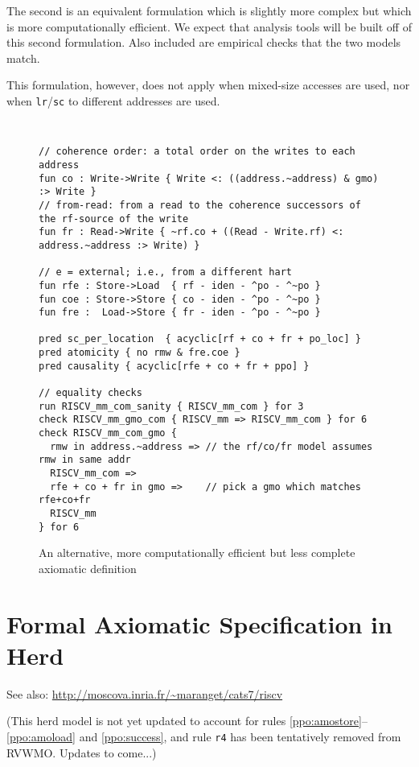 \clearpage
The second is an equivalent formulation which is slightly more complex but which is more computationally efficient.  We expect that analysis tools will be built off of this second formulation.  Also included are empirical checks that the two models match.

This formulation, however, does not apply when mixed-size accesses are used, nor when {\tt lr}/{\tt sc} to different addresses are used.

\begin{figure}[h!]
  {
  \tt\bfseries\centering\footnotesize
  \begin{lstlisting}
// coherence order: a total order on the writes to each address
fun co : Write->Write { Write <: ((address.~address) & gmo) :> Write }
// from-read: from a read to the coherence successors of the rf-source of the write
fun fr : Read->Write { ~rf.co + ((Read - Write.rf) <: address.~address :> Write) }

// e = external; i.e., from a different hart
fun rfe : Store->Load  { rf - iden - ^po - ^~po }
fun coe : Store->Store { co - iden - ^po - ^~po }
fun fre :  Load->Store { fr - iden - ^po - ^~po }

pred sc_per_location  { acyclic[rf + co + fr + po_loc] }
pred atomicity { no rmw & fre.coe }
pred causality { acyclic[rfe + co + fr + ppo] }

// equality checks
run RISCV_mm_com_sanity { RISCV_mm_com } for 3
check RISCV_mm_gmo_com { RISCV_mm => RISCV_mm_com } for 6
check RISCV_mm_com_gmo {
  rmw in address.~address => // the rf/co/fr model assumes rmw in same addr
  RISCV_mm_com =>
  rfe + co + fr in gmo =>    // pick a gmo which matches rfe+co+fr
  RISCV_mm
} for 6
\end{lstlisting}
  }
  \caption{An alternative, more computationally efficient but less complete axiomatic definition}
  \label{fig:com}
\end{figure}

\clearpage
\section{Formal Axiomatic Specification in Herd}

See also: \url{http://moscova.inria.fr/~maranget/cats7/riscv}

(This herd model is not yet updated to account for rules \ref{ppo:amostore}--\ref{ppo:amoload} and \ref{ppo:success}, and rule {\tt r4} has been tentatively removed from RVWMO.  Updates to come...)

